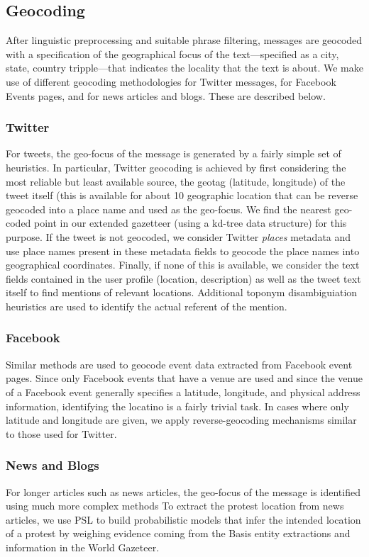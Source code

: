 \subsection{Geocoding}
\label{subsection:geocoding}
After linguistic preprocessing and suitable phrase filtering,
messages are geocoded with a
specification of the geographical focus of the text---specified as a
city, state, country tripple---that indicates the locality that the
text is about. We make use of different geocoding methodologies
for Twitter messages, for Facebook Events pages, and for news articles and blogs.
These are described below.

\subsubsection{Twitter}
For tweets, the geo-focus of the message is generated by a fairly
simple set of heuristics.  In particular, Twitter
geocoding is achieved by first considering the most reliable but least
available source, the geotag (latitude, longitude) of the tweet itself (this is available
for about 10%
geographic location that can be reverse geocoded into a place name
and used as the geo-focus. We find the nearest geo-coded point in
our extended gazetteer (using a kd-tree data structure) for this
purpose. If the tweet is not geocoded, we consider Twitter {\it places}
metadata and use place names present in these metadata fields to
geocode the place names into geographical coordinates. Finally, if
none of this is available, we consider the text fields contained in
the user profile (location, description) as well as the tweet text
itself to find mentions of relevant locations.  Additional toponym disambiguiation heuristics are used to
identify the actual referent of the mention.

\subsubsection{Facebook}
Similar methods are used to geocode event data extracted from Facebook event pages.  
Since only Facebook events that have a venue are used and since the
 venue of a Facebook event generally specifies a latitude, longitude, and physical address information, 
identifying the locatino is a fairly trivial task.  In cases where only latitude and longitude are given, 
we apply reverse-geocoding mechanisms similar to those used for Twitter.

\subsubsection{News and Blogs}
For longer articles such as news articles, the geo-focus of the message is identified using much more complex methods
To extract the protest location from news articles, we use PSL to build probabilistic models that infer the intended
location of a protest by 
weighing evidence coming from the Basis entity extractions and information in the World Gazeteer. 

